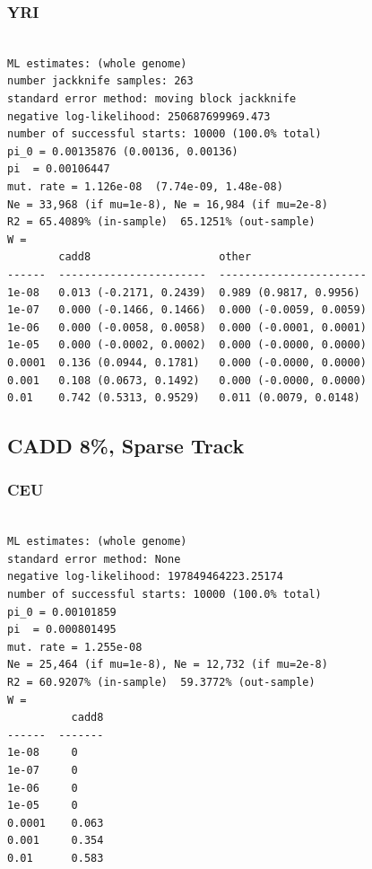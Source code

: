 \documentclass[11pt]{article}
\begin{document}
\subsubsection*{YRI}
\begin{minipage}{\linewidth}\begin{footnotesize}
\begin{verbatim}

ML estimates: (whole genome)
number jackknife samples: 263
standard error method: moving block jackknife
negative log-likelihood: 250687699969.473
number of successful starts: 10000 (100.0% total)
pi_0 = 0.00135876 (0.00136, 0.00136)
pi  = 0.00106447
mut. rate = 1.126e-08  (7.74e-09, 1.48e-08)
Ne = 33,968 (if mu=1e-8), Ne = 16,984 (if mu=2e-8)
R2 = 65.4089% (in-sample)  65.1251% (out-sample)
W = 
        cadd8                    other
------  -----------------------  -----------------------
1e-08   0.013 (-0.2171, 0.2439)  0.989 (0.9817, 0.9956)
1e-07   0.000 (-0.1466, 0.1466)  0.000 (-0.0059, 0.0059)
1e-06   0.000 (-0.0058, 0.0058)  0.000 (-0.0001, 0.0001)
1e-05   0.000 (-0.0002, 0.0002)  0.000 (-0.0000, 0.0000)
0.0001  0.136 (0.0944, 0.1781)   0.000 (-0.0000, 0.0000)
0.001   0.108 (0.0673, 0.1492)   0.000 (-0.0000, 0.0000)
0.01    0.742 (0.5313, 0.9529)   0.011 (0.0079, 0.0148)
\end{verbatim}
\end{footnotesize}\end{minipage}


\subsection{CADD 8\%, Sparse Track}
\subsubsection*{CEU}
\begin{minipage}{\linewidth}\begin{footnotesize}
\begin{verbatim}

ML estimates: (whole genome)
standard error method: None
negative log-likelihood: 197849464223.25174
number of successful starts: 10000 (100.0% total)
pi_0 = 0.00101859
pi  = 0.000801495
mut. rate = 1.255e-08 
Ne = 25,464 (if mu=1e-8), Ne = 12,732 (if mu=2e-8)
R2 = 60.9207% (in-sample)  59.3772% (out-sample)
W = 
          cadd8
------  -------
1e-08     0
1e-07     0
1e-06     0
1e-05     0
0.0001    0.063
0.001     0.354
0.01      0.583
\end{verbatim}
\end{footnotesize}\end{minipage}
\end{document}
